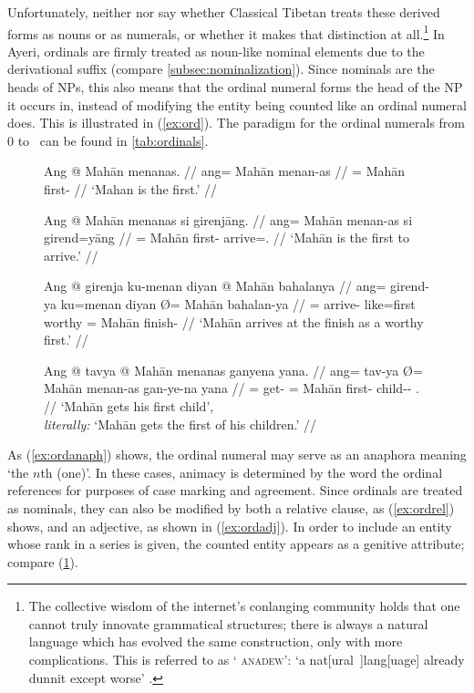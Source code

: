 Unfortunately, neither \citet{chungetal2014} nor \citet{beyer1992} say whether
Classical Tibetan treats these derived forms as nouns or as numerals, or
whether it makes that distinction at all.\footnote{The collective wisdom of the
internet's conlanging community holds that one cannot truly innovate
grammatical structures; there is always a natural language which has evolved
the same construction, only with more complications. This is referred to as `
\textsc{anadew}': `a nat[ural~]lang[uage] already dunnit except worse'
\citep{teoh2003}.} In Ayeri, ordinals are firmly treated as noun-like nominal
elements due to the derivational suffix  (compare
\autoref{subsec:nominalization}). Since nominals are the heads of NPs, this
also means that the ordinal numeral forms the head of the NP it occurs in,
instead of modifying the entity being counted like an ordinal numeral does.
This is illustrated in (\ref{ex:ord}). The paradigm for the ordinal numerals
from 0 to \elv\ can be found in
\autoref{tab:ordinals}.

\begin{figure}[h]
\pex\label{ex:ord}
\a\label{ex:ordanaph}\begingl
	\gla Ang @ Mahān menanas. //
	\glb ang= Mahān menan-as //
	\glc \Aarg{}= Mahān first-\Parg{} //
	\glft `Mahan is the first.' //
\endgl

\a\label{ex:ordrel}\begingl
	\gla Ang @ Mahān menanas si girenjāng. //
	\glb ang= Mahān menan-as si girend=yāng //
	\glc \Aarg{}= Mahān first-\Parg{} \Rel{} arrive=\TsgM{}.\Aarg{} //
	\glft `Mahān is the first to arrive.' //
\endgl

\a\label{ex:ordadj}\begingl
	\gla Ang @ girenja ku-menan diyan {} @ Mahān bahalanya //
	\glb ang= girend-ya ku=menan diyan Ø= Mahān bahalan-ya //
	\glc \Aarg{}= arrive-\TsgM{} like=first worthy \Top{}= Mahān 
		finish-\Loc{} //
	\glft `Mahān arrives at the finish as a worthy first.' //
\endgl

\a\label{ex:ordgen}\begingl
	\gla Ang @ tavya {} @ Mahān menanas ganyena yana. //
	\glb ang= tav-ya Ø= Mahān menan-as gan-ye-na yana //
	\glc \AgtT{}= get-\TsgM{} \Top{}= Mahān first-\Parg{} child-\Pl{}-\Gen{} 
		\TsgM{}.\Gen{} //
	\glft `Mahān gets his first child', \\
		\textit{literally:} `Mahān gets the first of his children.' //
\endgl
\xe
\end{figure}

As (\ref{ex:ordanaph}) shows, the ordinal numeral may serve as an anaphora
meaning `the $n$th (one)'. In these cases, animacy is determined by the word
the ordinal references for purposes of case marking and agreement. Since
ordinals are treated as nominals, they can also be modified by both a relative
clause, as (\ref{ex:ordrel}) shows, and an adjective, as shown in
(\ref{ex:ordadj}). In order to include an entity whose rank in a series is
given, the counted entity appears as a genitive attribute; compare
(\ref{ex:ordgen}).

